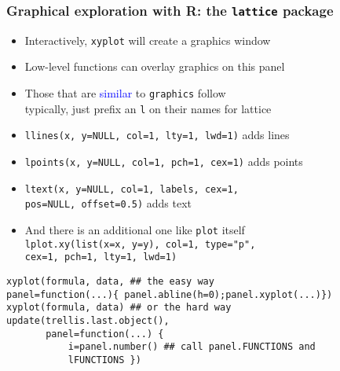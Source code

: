 \documentclass[11pt,pdftex,dvipsnames,usenames,helvetica]{beamer}
\begin{document}
\begin{frame}[fragile]
\frametitle{Graphical exploration with R: the {\tt lattice} package}
\begin{itemize}
\item Interactively, {\tt xyplot} will create a graphics window 
\item Low-level functions can overlay graphics on this panel
\item Those that are \textcolor{blue}{similar} to {\tt graphics} follow\\
typically, just prefix an {\tt l} on their names for lattice
\item {\tt llines(x, y=NULL, col=1, lty=1, lwd=1)} adds lines
\item {\tt lpoints(x, y=NULL, col=1, pch=1, cex=1)} adds points
\item {\tt ltext(x, y=NULL, col=1, labels, cex=1,\\ 
\quad %
pos=NULL, offset=0.5)} adds text
\item And there is an additional one like {\tt plot} itself \\
  {\tt lplot.xy(list(x=x, y=y), col=1, type="p",\\
    \quad cex=1, pch=1, lty=1,
    lwd=1)} %
\end{itemize}
\begin{verbatim}
xyplot(formula, data, ## the easy way
panel=function(...){ panel.abline(h=0);panel.xyplot(...)})  
xyplot(formula, data) ## or the hard way
update(trellis.last.object(),
       panel=function(...) {
           i=panel.number() ## call panel.FUNCTIONS and
           lFUNCTIONS })
\end{verbatim}
\end{frame}
\end{document}
